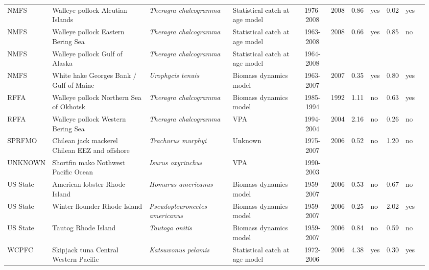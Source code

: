 \begin{longtable}{p{1.8cm}p{3.5cm}p{3.5cm}p{3cm}cccp{0.9cm}cp{0.9cm}c}
  NMFS & Walleye pollock Aleutian Islands & \textit{Theragra chalcogramma} & Statistical catch at age model & 1976-2008 & 2008 & 0.86 & yes & 0.02 & yes & \cite{AFSC-WPOLLAI-2008-Walleye pollock AI.pdf} \\ 
  NMFS & Walleye pollock Eastern Bering Sea & \textit{Theragra chalcogramma} & Statistical catch at age model & 1963-2008 & 2008 & 0.66 & yes & 0.85 & no & \cite{AFSC-WPOLLEBS-2008-Walleye pollock EBS.pdf} \\ 
  NMFS & Walleye pollock Gulf of Alaska & \textit{Theragra chalcogramma} & Statistical catch at age model & 1964-2008 &  &  &  &  &  & \cite{AFSC-WPOLLGA-2008-Walleye pollock GA.pdf} \\ 
  NMFS & White hake Georges Bank / Gulf of Maine & \textit{Urophycis tenuis} & Biomass dynamics model & 1963-2007 & 2007 & 0.35 & yes & 0.80 & yes & \cite{WhiteHake2008.pdf} \\ 
  RFFA & Walleye pollock Northern Sea of Okhotsk & \textit{Theragra chalcogramma} & Biomass dynamics model & 1985-1994 & 1992 & 1.11 & no & 0.63 & yes & \cite{WPOLLNSO-1997-JENSEN.pdf} \\ 
  RFFA & Walleye pollock Western Bering Sea & \textit{Theragra chalcogramma} & VPA & 1994-2004 & 2004 & 2.16 & no & 0.26 & no & \cite{WPOLLWBS-2004-JENSEN.pdf} \\ 
  SPRFMO & Chilean jack mackerel Chilean EEZ and offshore & \textit{Trachurus murphyi} & Unknown & 1975-2007 & 2006 & 0.52 & no & 1.20 & no & \cite{JENSEN-JACKMACKCH-2008.pdf} \\ 
  UNKNOWN & Shortfin mako Nothwest Pacific Ocean & \textit{Isurus oxyrinchus} & VPA & 1990-2003 &  &  &  &  &  & \cite{Chang-Liu-2009-Shortfin-mako-NWPAC.pdf} \\ 
  US State & American lobster Rhode Island & \textit{Homarus americanus} & Biomass dynamics model & 1959-2007 & 2006 & 0.53 & no & 0.67 & no & \cite{NA} \\ 
  US State & Winter flounder Rhode Island & \textit{Pseudopleuronectes americanus} & Biomass dynamics model & 1959-2007 & 2006 & 0.25 & no & 2.02 & yes & \cite{NA} \\ 
  US State & Tautog Rhode Island & \textit{Tautoga onitis} & Biomass dynamics model & 1959-2007 & 2006 & 0.84 & no & 0.59 & no & \cite{NA} \\ 
  WCPFC & Skipjack tuna Central Western Pacific & \textit{Katsuwonus pelamis} & Statistical catch at age model & 1972-2006 & 2006 & 4.38 & yes & 0.30 & yes & \cite{SC4-SA-WP4-SKJ-Assessment-rev1-skipjack.pdf} \\ 

\end{longtable}
